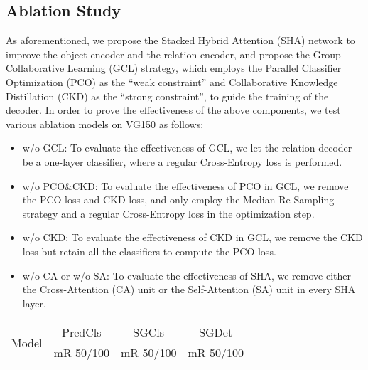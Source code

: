 \documentclass[10pt,twocolumn,letterpaper]{article}
\begin{document}
{\subsection{Ablation Study}
As aforementioned, we propose the Stacked Hybrid Attention (SHA) network to improve the object encoder and the relation encoder, and propose the Group Collaborative Learning (GCL) strategy, which employs the Parallel Classifier Optimization (PCO) as the ``weak constraint'' and Collaborative Knowledge Distillation (CKD) as the ``strong constraint'', to guide the training of the decoder. In order to prove the effectiveness of the above components, we test various ablation models on VG150 as follows: 

\vspace{-0.2cm}
\begin{itemize}
\setlength{\itemsep}{0pt}
\setlength{\parsep}{0pt}
\setlength{\parskip}{0pt}
	\item w/o-GCL: To evaluate the effectiveness of GCL, we let the relation decoder be a one-layer classifier, where a regular Cross-Entropy loss is performed.
	
	\item w/o PCO\&CKD: To evaluate the effectiveness of PCO in GCL, we remove the PCO loss and CKD loss, and only employ the Median Re-Sampling strategy and a regular Cross-Entropy loss in the optimization step.
	
	\item w/o CKD: To evaluate the effectiveness of CKD in GCL, we remove the CKD loss but retain all the classifiers to compute the PCO loss.
	
	\item w/o CA or w/o SA: To evaluate the effectiveness of SHA, we remove either the Cross-Attention (CA) unit or the Self-Attention (SA) unit in every SHA layer.

\end{itemize}
\vspace{-0.2cm}

\begin{table}[t]
	\small
	\vspace{0.4cm}
	\begin{tabular}{p{2.3cm}|p{1.4cm}<{\centering}|p{1.4cm}<{\centering}|p{1.4cm}<{\centering}}
		\hline
		\multicolumn{1}{c|}{\multirow{2}{*}{Model}} & \multicolumn{1}{c|}{PredCls}& \multicolumn{1}{c|}{SGCls}&\multicolumn{1}{c}{SGDet}
		\\ 
		\cline{2-4} 
		\multicolumn{1}{c|}{} & \multicolumn{1}{c|}{mR 50/100} & \multicolumn{1}{c|}{mR 50/100} & \multicolumn{1}{c}{mR 50/100} \\ \hline
		

\end{tabular}
\end{table}}
\end{document}
